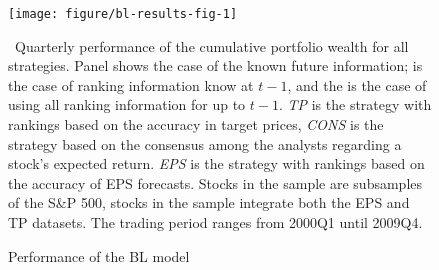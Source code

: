 \documentclass[a4paper,twoside,12pt,openright,notitlepage]{report}\usepackage[]{graphicx}\usepackage[]{color}
\makeatletter
\def\maxwidth{ %
  \ifdim\Gin@nat@width>\linewidth
    \linewidth
  \else
    \Gin@nat@width
  \fi
}
\newenvironment{knitrout}{}{} %
\makeatother
\begin{document}
\begin{figure}
\begin{knitrout}
\color{fgcolor}
\texttt{[image: figure/bl-results-fig-1]} 

\end{knitrout}
\caption{Performance of the BL model}
\label{fig:bl-results}
\ Quarterly performance of the cumulative portfolio wealth for all strategies. Panel \tr{} shows the case of the known future information; \naive{} is the case of ranking information know at $t-1$, and the  is the case of using all ranking information for up to $t-1$. \textit{TP} is the strategy with rankings based on the accuracy in target prices, \textit{CONS} is the strategy based on the consensus among the analysts regarding a stock's expected return. \textit{EPS} is the strategy with rankings based on the accuracy of EPS forecasts. Stocks in the \all{} sample are subsamples of the S\&P 500, stocks in the \same{} sample integrate both the EPS and TP datasets. The trading period ranges from 2000Q1 until 2009Q4.
\end{figure}
\end{document}
